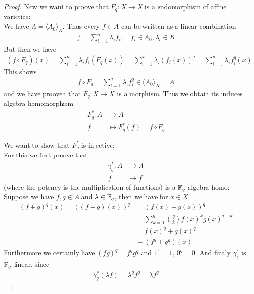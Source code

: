 \documentclass[]{article}
\begin{document}
\begin{proof}
    Now we want to proove that \(F_q:X \rightarrow X\) is a endomorphism of affine varieties: \\
    We have \(A = \langle A_0 \rangle_K\). Thus every \( f \in A \) can be written as a linear combination 
    \begin{align*}
        f = \sum_{i=1}^{n}\lambda_i f_i, \quad f_i \in A_0, \lambda_i \in K
    \end{align*}
    But then we have
    \begin{align*}
        (f \circ F_q)(x)= \sum_{i=1}^{n}\lambda_i f_i(F_q(x)) = \sum_{i=1}^{n}\lambda_i (f_i(x))^q= \sum_{i=1}^{n}\lambda_i f_i^q(x) 
    \end{align*}
    This shows 
    \begin{align*}
       f \circ F_q = \sum_{i=1}^{n}\lambda_i f_i^q \in \langle A_0 \rangle_K = A
    \end{align*}
    and we have prooven that \(F_q:X \rightarrow X\) is a morphism. Thus we obtain its induces algebra homomorphism
    \begin{align*}
        F_q^*:A &\rightarrow A \\
                f  &\mapsto F_q^*(f)= f \circ F_q
    \end{align*}
        
    We want to show that \(F_q^*\) is injective: \\
    
    For this we first proove that
    \begin{align*}
        \gamma_q^*:A &\rightarrow A \\
                    f &\mapsto f^q
    \end{align*}
    (where the potency is the multiplication of functions) is a \({\mathbb{F}}_q\)-algebra homo:
    Suppose we have \(f,g \in A\) and \(\lambda \in {\mathbb{F}}_q\), then we have for \(x \in X\)
    \begin{align*}
        (f+g)^q(x) = ((f+g)(x))^q&=(f(x)+g(x))^q \\
        &=\sum_{k=0}^{q}\binom{q}{k}f(x)^k g(x)^{q-k} \\
        &=f(x)^q + g(x)^q \\
        &=(f^q+g^q)(x)
    \end{align*}
    Furthermore we certainly have \((fg)^q = f^q g^q\) and \(1^q=1, \ 0^q = 0\). And finaly \(\gamma_q^*\) is \({\mathbb{F}}_q\)-linear, since 
    \begin{align*}
        \gamma_q^*(\lambda f)= \lambda^q f^q = \lambda f^q
    \end{align*}


\end{proof}
\end{document}
